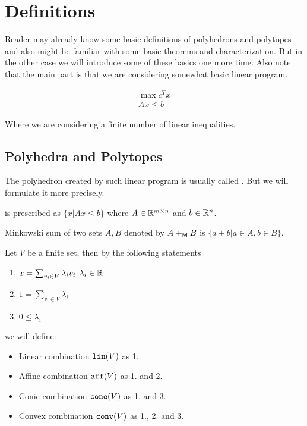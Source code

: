 \chapter{Definitions}

Reader may already know some basic definitions of polyhedrons and polytopes and also might be familiar with some basic theorems and characterization. But in the other case we will introduce some of these basics one more time. Also note that the main part is that we are considering somewhat basic linear program.

$$
\begin{aligned}
	\max c^{T} x \\
	A x \leq b
\end{aligned}
$$

\noindent Where we are considering a finite number of linear inequalities.

\section{Polyhedra and Polytopes}

The polyhedron created by such linear program is usually called . But we will formulate it more precisely.

\begin{defn}
	 is prescribed as $\{x | A x \leq b\}$ where $A \in \mathbb{R}^{m \times n}$ and $b \in \mathbb{R}^{n}$.
\end{defn}

\begin{defn}
	Minkowski sum of two sets $A,B$ denoted by $A +_{\mathsf{M}} B$ is $\{a + b | a \in A, b \in B\}$.
\end{defn}

\begin{defn}[Combinations]
	Let $V$ be a finite set, then by the following statements

	\begin{enumerate}
			\item $x = \sum_{v_{i} \in V} \lambda_{i} v_{i}, \lambda_{i} \in \mathbb{R}${}
			\item $1 = \sum_{v_{i} \in V} \lambda_{i}$
			\item $0 \leq \lambda_{i}$
	\end{enumerate}

	\noindent we will define:

	\begin{itemize}
			\item Linear combination $\mathtt{lin}(V)$ as 1.
			\item Affine combination $\mathtt{aff}(V)$ as 1. and 2.
			\item Conic combination $\mathtt{cone}(V)$ as 1. and 3.
			\item Convex combination $\mathtt{conv}(V)$ as 1., 2. and 3.
	\end{itemize}
\end{defn}

